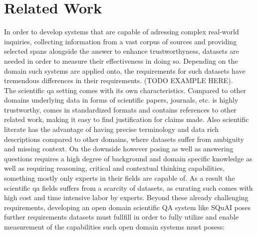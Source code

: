 \chapter{Related Work}
\label{cha:RelatedWork}

In order to develop systems that are capable of adressing complex real-world inquiries, collecting information from a vast corpus of sources and providing selected spans alongside the answer to enhance trustworthyness, datasets are needed in order to measure their effectiveness in doing so. Depending on the domain such systems are applied onto, the requirements for such datasets have tremendous differences in their requirements. (TODO EXAMPLE HERE). \\
The scientific qa setting comes with its own characteristics. Compared to other domains underlying data in forms of scientific papers, journals, etc. is highly trustworthy, comes in standardized formats and contains references to other related work, making it easy to find justification for claims made. Also scientific literate has the advantage of having precise terminology and data rich descriptions compared to other domains, where datasets suffer from ambiguity and missing context. On the downside however posing as well as answering questions requires a high degree of background and domain specific knowledge as well as requiring reasoning, critical and contextual thinking capabilities, something mostly only experts in their fields are capable of. As a result the scientific qa fields suffers from a scarcity of datasets, as curating such comes with high cost and time intensive labor by experts. Beyond these already challenging requirements, developing an open domain scientific QA system like SQuAI poses further requirements datasets must fullfill in order to fully utilize and enable measurement of the capabilities such open domain systems must posess:
